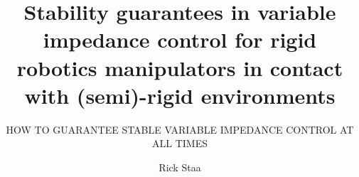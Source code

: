 \documentclass{layout/tudelft-report}
\begin{document}
\frontmatter

\title{Stability guarantees in variable impedance control for rigid robotics manipulators in contact with (semi)-rigid environments}
\subtitle{HOW TO GUARANTEE STABLE VARIABLE IMPEDANCE CONTROL AT ALL TIMES}
\author{Rick Staa}
\subject{ME51010: ME-BMD Literature Report}



\makecover


% 


\tableofcontents
\listoffigures
\listoftables
{}



\mainmatter










\setcounter{biburlnumpenalty}{7000}
\setcounter{biburllcpenalty}{7000}
\setcounter{biburlucpenalty}{7000}

\printbibliography[heading=bibintoc,title=References]


\appendix


\end{document}

